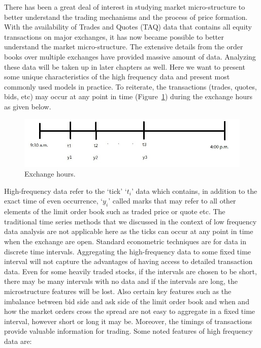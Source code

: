 There has been a great deal of interest in studying market micro-structure to better understand the trading mechanisms and the process of price formation. With the availability of Trades and Quotes (TAQ) data that contains all equity transactions on major exchanges, it has now became possible to better understand the market micro-structure. The extensive details from the order books over multiple exchanges have provided massive amount of data. Analyzing these data will be taken up in later chapters as well. Here we want to present some unique characteristics of the high frequency data and present most commonly used models in practice. To reiterate, the transactions (trades, quotes, bids, etc) may occur at any point in time (Figure~\ref{fig:exchhours}) during the exchange hours as given below.
	\begin{figure}[!ht]
	\centering
	\includegraphics[width=\textwidth]{chapters/chapter_uvts/figures/33d1.jpg}
	\caption{Exchange hours. \label{fig:exchhours}}
	\end{figure}
High-frequency data refer to the `tick' `$t_i$' data which contains, in addition to the exact time of even occurrence, `$y_i$' called marks that may refer to all other elements of the limit order book such as traded price or quote etc. The traditional time series methods that we discussed in the context of low frequency data analysis are not applicable here as the ticks can occur at any point in time when the exchange are open. Standard econometric techniques are for data in discrete time intervals. Aggregating the high-frequency data to some fixed time interval will not capture the advantages of having access to detailed transaction data. Even for some heavily traded stocks, if the intervals are chosen to be short, there may be many intervals with no data and if the intervals are long, the microstructure features will be lost. Also certain key features such as the imbalance between bid side and ask side of the limit order book and when and how the market orders cross the spread are not easy to aggregate in a fixed time interval, however short or long it may be. Moreover, the timings of transactions provide valuable information for trading. Some noted features of high frequency data are:

